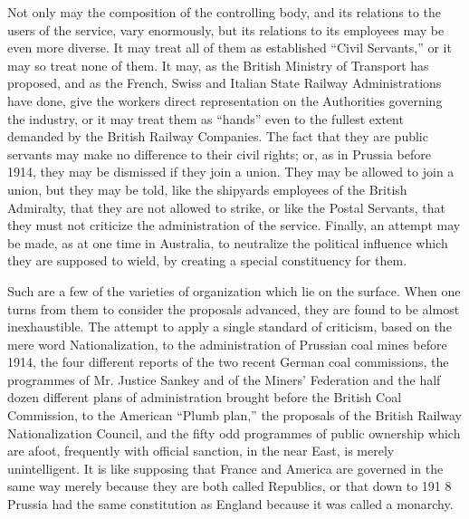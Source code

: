 \documentclass{book}
\begin{document}
Not only may the composition of the controlling body, and its relations to the users of the service, vary enormously, but its relations to its employees may be even more diverse. It may treat all of them as established “Civil Servants,” or it may so treat none of them. It may, as the British Ministry of Transport has proposed, and as the French, Swiss and Italian State Railway Administrations have done, give the workers direct representation on the Authorities governing the industry, or it may treat them as “hands” even to the fullest extent demanded by the British Railway Companies. The fact that they are public servants may make no difference to their civil rights; or, as in Prussia before 1914, they may be dismissed if they join a union. They may be allowed to join a union, but they may be told, like the shipyards employees of the British Admiralty, that they are not allowed to strike, or like the Postal Servants, that they must not criticize the administration of the service. Finally, an attempt may be made, as at one time in Australia, to neutralize the political influence which they are supposed to wield, by creating a special constituency for them.

Such are a few of the varieties of organization which lie on the surface. When one turns from them to consider the proposals advanced, they are found to be almost inexhaustible. The attempt to apply a single standard of criticism, based on the mere word Nationalization, to the administration of Prussian coal mines before 1914, the four different reports of the two recent German coal commissions, the programmes of Mr. Justice Sankey and of the Miners’ Federation and the half dozen different plans of administration brought before the British Coal Commission, to the American “Plumb plan,” the proposals of the British Railway Nationalization Council, and the fifty odd programmes of public ownership which are afoot, frequently with official sanction, in the near East, is merely unintelligent. It is like supposing that France and America are governed in the same way merely because they are both called Republics, or that down to 191 8 Prussia had the same constitution as England because it was called a monarchy.
\end{document}
